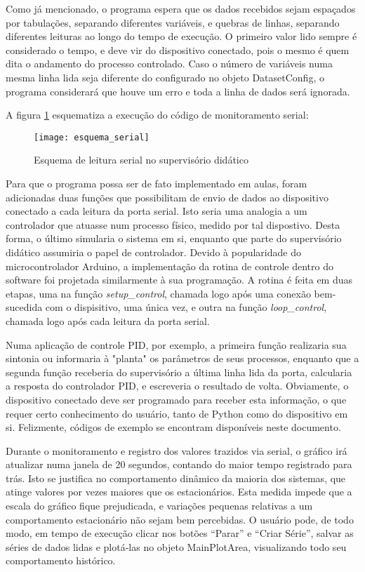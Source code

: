 Como já mencionado, o programa espera que os dados recebidos sejam espaçados por tabulações, separando diferentes variáveis, e quebras de linhas, separando diferentes leituras ao longo do tempo de execução. O primeiro valor lido sempre é considerado o tempo, e deve vir do dispositivo conectado, pois o mesmo é quem dita o andamento do processo controlado. Caso o número de variáveis numa mesma linha lida seja diferente do configurado no objeto DatasetConfig, o programa considerará que houve um erro e toda a linha de dados será ignorada.

A figura \ref{img_esquema_serial} esquematiza a execução do código de monitoramento serial:

\begin{figure}[hbt]
	\centering
	\caption{Esquema de leitura serial no supervisório didático}
	\texttt{[image: esquema\_serial]}
	\label{img_esquema_serial}
\end{figure}

Para que o programa possa ser de fato implementado em aulas, foram adicionadas duas funções que possibilitam de envio de dados ao dispositivo conectado a cada leitura da porta serial. Isto seria uma analogia a um controlador que atuasse num processo físico, medido por tal dispostivo. Desta forma, o último simularia o sistema em si, enquanto que parte do supervisório didático assumiria o papel de controlador. Devido à popularidade do microcontrolador Arduino, a implementação da rotina de controle dentro do software foi projetada similarmente à sua programação. A rotina é feita em duas etapas, uma na função \emph{setup\_control}, chamada logo após uma conexão bem-sucedida com o dispisitivo, uma única vez, e outra na função \emph{loop\_control}, chamada logo após cada leitura da porta serial.

Numa aplicação de controle PID, por exemplo, a primeira função realizaria sua sintonia ou informaria à "planta" os parâmetros de seus processos, enquanto que a segunda função receberia do supervisório a última linha lida da porta, calcularia a resposta do controlador PID, e escreveria o resultado de volta. Obviamente, o dispositivo conectado deve ser programado para receber esta informação, o que requer certo conhecimento do usuário, tanto de Python como do dispositivo em si. Felizmente, códigos de exemplo se encontram disponíveis neste documento.

Durante o monitoramento e registro dos valores trazidos via serial, o gráfico irá atualizar numa janela de 20 segundos, contando do maior tempo registrado para trás. Isto se justifica no comportamento dinâmico da maioria dos sistemas, que atinge valores por vezes maiores que os estacionários. Esta medida impede que a escala do gráfico fique prejudicada, e variações pequenas relativas a um comportamento estacionário não sejam bem percebidas. O usuário pode, de todo modo, em tempo de execução clicar nos botões “Parar” e “Criar Série”, salvar as séries de dados lidas e plotá-las no objeto MainPlotArea, visualizando todo seu comportamento histórico.

